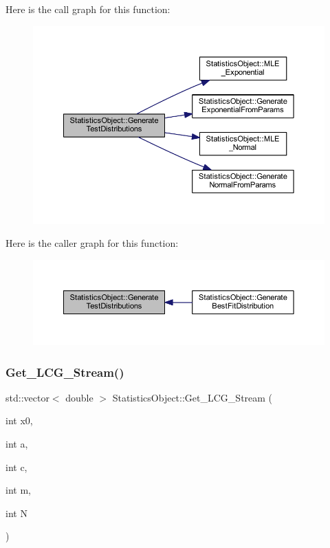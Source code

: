 Here is the call graph for this function\+:
\nopagebreak
\begin{figure}[H]
\begin{center}
\leavevmode
\includegraphics[width=350pt]{class_statistics_object_a7efac97d5d339216bb81bd361419799d_cgraph}
\end{center}
\end{figure}
Here is the caller graph for this function\+:
\nopagebreak
\begin{figure}[H]
\begin{center}
\leavevmode
\includegraphics[width=350pt]{class_statistics_object_a7efac97d5d339216bb81bd361419799d_icgraph}
\end{center}
\end{figure}
\mbox{\label{class_statistics_object_a983e11b6d3562ae303f5cc925be448e2}} 
\subsubsection{\texorpdfstring{Get\+\_\+\+L\+C\+G\+\_\+\+Stream()}{Get\_LCG\_Stream()}}
{\footnotesize\ttfamily std\+::vector$<$ double $>$ Statistics\+Object\+::\+Get\+\_\+\+L\+C\+G\+\_\+\+Stream (\begin{DoxyParamCaption}\item[{int}]{x0,  }\item[{int}]{a,  }\item[{int}]{c,  }\item[{int}]{m,  }\item[{int}]{N }\end{DoxyParamCaption})}



